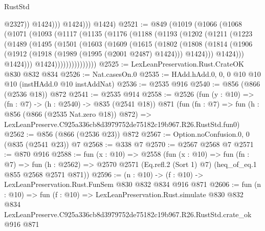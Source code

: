 \begin{lexlean}{RustStd}
\begin{coremodule}
                      @2327))
                  @1424)))
            @1424)))
      @1424)
@2521 := @849
    (@1019
      (@1066
        (@1068
          (@1071
            (@1093
              (@1117
                (@1135
                  (@1176
                    (@1188
                      (@1193
                        (@1202
                          (@1211
                            (@1223
                              (@1489
                                (@1495
                                  (@1501
                                    (@1603
                                      (@1609
                                        (@1615
                                          (@1802
                                            (@1808
                                              (@1814
                                                (@1906
                                                  (@1912
                                                    (@1918 (@1989 (@1995 (@2001 @2487) @1424)))
                                                    @1424)))
                                              @1424)))
                                        @1424)))
                                  @1424)))))))))))))))
@2525 := LexLeanPreservation.Rust.CrateOK @830 @832 @834
@2526 := Nat.casesOn.{0}
@2535 := HAdd.hAdd.{0, 0, 0} @10 @10 @10 (instHAdd.{0} @10 instAddNat)
@2536 := @2535 @916
@2540 := @856 (@866 (@2536 @18)) @872
@2541 := @2535 @914
@2558 := @2526
    (fun (y : @10) => (fn : @7) -> (h : @2540) -> @835 (@2541 @18))
    @871
    (fun (fn : @7) =>
    fun (h : @856 (@866 (@2535 Nat.zero @18)) @872) =>
    LexLeanPreserve.C925a336cb8d3979752de75182c19b967.R26.RustStd.fun0)
@2562 := @856 (@866 (@2536 @23)) @872
@2567 := Option.noConfusion.{0, 0} (@835 (@2541 @23)) @7
@2568 := @338 @7
@2570 := @2567 @2568 @7
@2571 := @870 @916
@2588 := fun (x : @10) =>
  @2558
    (fun (x : @10) =>
    fun (fn : @7) =>
    fun (h : @2562) => @2570 @2571 (Eq.refl.{2} (Sort 1) @7) (heq_of_eq.{1} @855 @2568 @2571 @871))
@2596 := (n : @10) -> (f : @10) -> LexLeanPreservation.Rust.FunSem @830 @832 @834 @916 @871
@2606 := fun (n : @10) =>
  fun (f : @10) =>
  LexLeanPreservation.Rust.simulate
    @830
    @832
    @834
    LexLeanPreserve.C925a336cb8d3979752de75182c19b967.R26.RustStd.crate_ok
    @916
    @871
\end{coremodule}
\end{lexlean}
